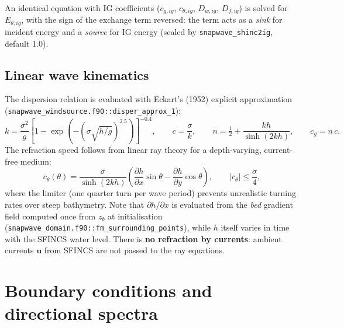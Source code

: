 \documentclass[11pt,a4paper]{article}
\newcommand{\code}[1]{\texttt{#1}}
\begin{document}
An identical equation with IG coefficients ($c_{g,ig}$, $c_{\theta,ig}$,
$D_{w,ig}$, $D_{f,ig}$) is solved for $E_{\theta,ig}$, with the sign of the
exchange term reversed: the term acts as a \emph{sink} for incident energy and a
\emph{source} for IG energy (scaled by \code{snapwave\_shinc2ig}, default 1.0).

\subsection{Linear wave kinematics}

The dispersion relation is evaluated with Eckart's (1952) explicit
approximation (\code{snapwave\_windsource.f90::disper\_approx\_1}):
\begin{equation}
k=\frac{\sigma^{2}}{g}
\left[1-\exp\!\left(-\left(\sigma\sqrt{h/g}\right)^{2.5}\right)\right]^{-0.4},
\qquad
c=\frac{\sigma}{k},\qquad
n=\tfrac{1}{2}+\frac{kh}{\sinh(2kh)},\qquad
c_g=n\,c .
\label{eq:dispersion}
\end{equation}
The refraction speed follows from linear ray theory for a depth-varying,
current-free medium:
\begin{equation}
c_\theta(\theta)=
\frac{\sigma}{\sinh(2kh)}
\left(\frac{\partial h}{\partial x}\sin\theta-\frac{\partial h}{\partial y}\cos\theta\right),
\qquad
|c_\theta|\le \frac{\sigma}{4},
\label{eq:ctheta}
\end{equation}
where the limiter (one quarter turn per wave period) prevents unrealistic
turning rates over steep bathymetry. Note that $\partial h/\partial x$ is
evaluated from the \emph{bed} gradient field computed once from $z_b$ at
initialisation (\code{snapwave\_domain.f90::fm\_surrounding\_points}), while
$h$ itself varies in time with the SFINCS water level. There is \textbf{no
refraction by currents}: ambient currents $\mathbf{u}$ from SFINCS are not
passed to the ray equations.


\section{Boundary conditions and directional spectra}
\label{sec:boundaries}
\end{document}

